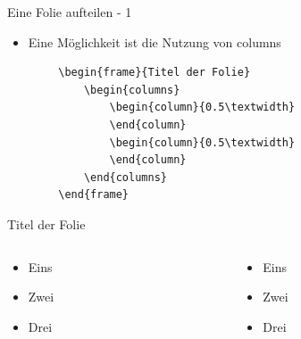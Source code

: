 \documentclass{beamer}
\begin{document}
\begin{frame}[containsverbatim]{Eine Folie aufteilen - 1}
    \begin{itemize}
        \item Eine Möglichkeit ist die Nutzung von columns
    \end{itemize}
    \begin{lstlisting}
        \begin{frame}{Titel der Folie}
            \begin{columns}
                \begin{column}{0.5\textwidth}
                \end{column}
                \begin{column}{0.5\textwidth}
                \end{column}
            \end{columns}
        \end{frame}
    \end{lstlisting}
\end{frame}


\begin{frame}{Titel der Folie}
    \begin{columns}
        \begin{column}{0.5\textwidth}
            \begin{itemize}
                \item Eins
                \item Zwei
                \item Drei
            \end{itemize}
        \end{column}
        \begin{column}{0.5\textwidth}
            \begin{itemize}
                \item Eins
                \item Zwei
                \item Drei
            \end{itemize}
        \end{column}
    \end{columns}
\end{frame}

\end{document}
